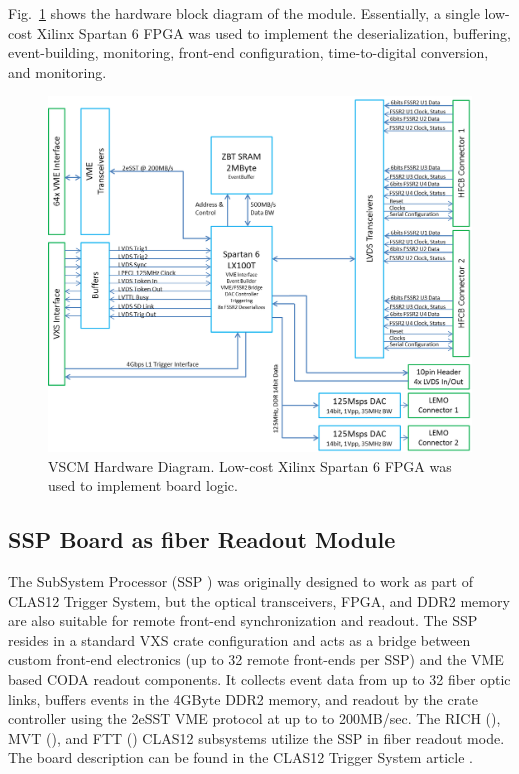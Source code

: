 Fig.~\ref{fig:vscm_blockdiagram} shows the hardware block diagram of the module. Essentially, a single low-cost Xilinx Spartan 6 FPGA was used to implement the deserialization, buffering, event-building, monitoring, front-end configuration, time-to-digital conversion, and monitoring.

\begin{figure}[hbt]
	\centering
	\includegraphics[width=1.0\columnwidth,keepaspectratio]{img/vscm_blockdiagram.png}
	\caption{VSCM Hardware Diagram. Low-cost Xilinx Spartan 6 FPGA was used to implement board logic.}
	\label{fig:vscm_blockdiagram}
\end{figure}


\subsection{SSP Board as fiber Readout Module}

The SubSystem Processor (SSP \cite{ssp-ref}) was originally designed to work as part of CLAS12 Trigger System, but the optical transceivers, FPGA, and DDR2 memory are also suitable for remote front-end synchronization and readout. The SSP resides in a standard VXS crate configuration and acts as a bridge between custom front-end electronics (up to 32 remote front-ends per SSP) and the VME based CODA readout components. It collects event data from up to 32 fiber optic links, buffers events in the 4GByte DDR2 memory, and readout by the crate controller using the 2eSST VME protocol at up to to 200MB/sec. The RICH (\cite{rich-ref}), MVT (\cite{mvt-ref}), and FTT (\cite{ftt-ref}) CLAS12 subsystems utilize the SSP in fiber readout mode. The board description can be found in the CLAS12 Trigger System article \cite{trig-ref}.

